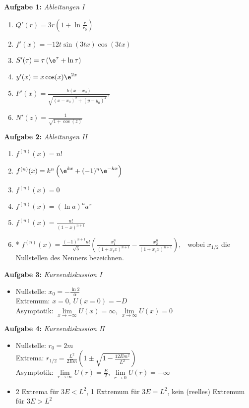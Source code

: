 
\textbf{Aufgabe 1: } \emph{Ableitungen I}
\begin{enumerate}[label=(\alph*)]
    \item $Q'(r)=3r\left(1+\ln\frac{r}{r_0}\right)$
    \item $f'(x)=-12t\sin(3tx)\cos(3tx)$
    \item $S'(\tau)=\tau\left(\e^{\tau}+\ln\tau\right)$
    \item $y'(x)=x\cos(x)\e^{2x}$
    \item $F'(x)=\frac{k(x-x_0)}{\sqrt{(x-x_0)^2+(y-y_0)^2}^{\ \!3}}$
    \item $N'(z)=\frac{1}{\sqrt{1+\cos(z)}}$
\end{enumerate}
\vspace{0.7cm}
%
\textbf{Aufgabe 2: } \emph{Ableitungen II}
\begin{enumerate}[label=(\alph*)]
    \item $f^{(n)}(x)=n!$
    \item $f^{(n)}(x)=k^n\left(\e^{kx}+(-1)^n\e^{-kx}\right)$
    \item $f^{(n)}(x)=0$
    \item $f^{(n)}(x)=\left(\ln a\right)^n a^x$
    \item $f^{(n)}(x)=\frac{n!}{(1-x)^{n+1}}$
    \item* $f^{(n)}(x)=\frac{(-1)^{n+1} n!}{\sqrt{5}}\left(\frac{x_1^n}{(1+x_1x)^{n+1}}-\frac{x_2^n}{(1+x_2x)^{n+1}}\right)$,\ \ wobei $x_{1/2}$ die Nullstellen des Nenners bezeichnen.
\end{enumerate}
\vspace{0.7cm}
%
\newpage
\textbf{Aufgabe 3: } \emph{Kurvendiskussion I}
\begin{itemize}
    \item Nullstelle: $x_0=-\frac{\ln 2}{\alpha}$\\[0.2cm]
    Extremum: $x=0$, $U(x=0)=-D$\\[0.2cm]
    Asymptotik: $\lim\limits_{x\rightarrow -\infty}U(x)=\infty$, $\lim\limits_{x\rightarrow \infty}U(x)=0$\\
\end{itemize}
\vspace{1cm}
%
\textbf{Aufgabe 4: } \emph{Kurvendiskussion II}
\begin{itemize}
    \item Nullstelle: $r_0=2m$\\[0.2cm]
    Extrema: $r_{1/2}=\frac{L^2}{2Em}\left(1\pm\sqrt{1-\frac{12Em^2}{L^2}}\right)$\\[0.2cm]
    Asymptotik: $\lim\limits_{r\rightarrow\infty}U(r)=\frac{E}{2}$, $\lim\limits_{r\rightarrow 0}U(r)=-\infty$
    \item 2 Extrema für $3E<L^2$, 1 Extremum für $3E=L^2$, kein (reelles) Extremum für $3E>L^2$
\end{itemize}
\vspace{1cm}
%

